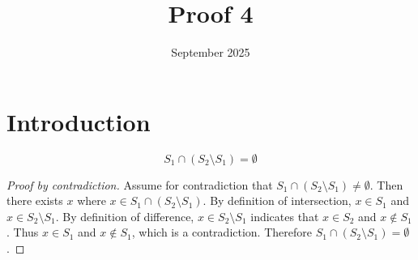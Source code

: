 \documentclass{article}
\title{Proof 4}
\date{September 2025}
\begin{document}
\maketitle

\section{Introduction}
\[
S_1 \cap (S_2 \setminus S_1) = \emptyset
\]

\begin{proof}[Proof by contradiction]
Assume for contradiction that \(S_1 \cap (S_2 \setminus S_1) \neq \emptyset\).
Then there exists \(x\) where \(x \in S_1 \cap (S_2 \setminus S_1)\).
By definition of intersection, \(x \in S_1\) and \(x \in S_2 \setminus S_1\).
By definition of difference, \(x \in S_2 \setminus S_1\) indicates that \(x \in S_2\) and \(x \notin S_1\).
Thus \(x \in S_1\) and \(x \notin S_1\), which is a contradiction.
Therefore \(S_1 \cap (S_2 \setminus S_1) = \emptyset\).
\end{proof}
\end{document}
